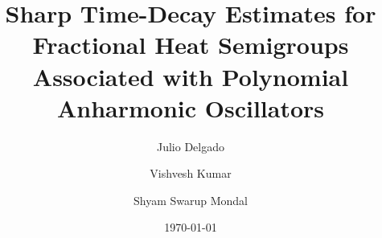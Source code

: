 \documentclass[12pt, reqno]{amsart}
\theoremstyle{definition}
\theoremstyle{remark}
\numberwithin{equation}{section}
\begin{document}
\setcounter{page}{1}


\title[Semigroups Associated with Polynomial Anharmonic Oscillators]{Sharp Time-Decay Estimates for Fractional Heat Semigroups Associated with Polynomial Anharmonic Oscillators}
  

  \author[J. Delgado]{Julio Delgado}
\address{
  Julio Delgado:
  \endgraf
  Departmento de Matematicas
  \endgraf
  Universidad del Valle
  \endgraf
  Cali-Colombia
  \endgraf
    {\it E-mail address} {\rm delgado.julio@correounivalle.edu.co}}

\author[V. Kumar]{Vishvesh Kumar}
\address{
  Vishvesh Kumar:
  \endgraf
  Department of Mathematical Sciences 
  \endgraf
  Indian Institute of Technology (BHU) Varanasi, Varanasi, India
  \endgraf
  {\it E-mail address} {\rm  vishvesh.mat@iitbhu.ac.in}
  }

  \author[Shyam S. Mondal]{Shyam Swarup Mondal} \address{Shyam Swarup Mondal    \endgraf  Stat-Math Unit \endgraf Indian Statistical Institute (ISI) Kolkata, 203 BT Road,	Kolkata 700108, India} 




\date{\today}
\end{document}
